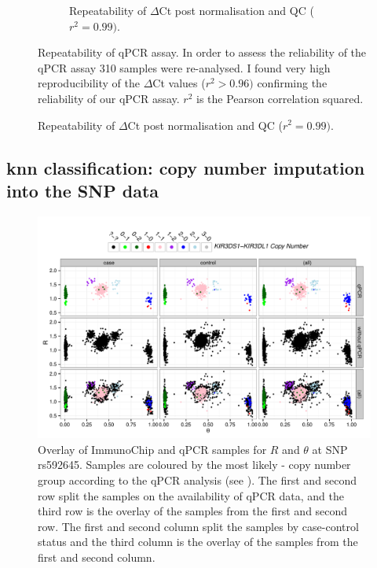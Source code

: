 \begin{figure}[h]
\begin{subfigure}[b]{.4\textwidth}
        \caption{Repeatability of  $\Delta$Ct post normalisation and QC ($r^{2}=0.99)$.}
        \label{}
    \end{subfigure}
    {Repeatability of qPCR assay.}
    {
        In order to assess the reliability of the qPCR assay 310 samples were re-analysed.
        I found very high reproducibility of the $\Delta$Ct values ($r^{2} > 0.96)$ confirming the reliability of our qPCR assay.
        $r^2$ is the Pearson correlation squared.
    }
\end{figure} 




\subsection{\gls{knn} classification: copy number imputation into the SNP data}

\begin{figure}[h!]
  \centering
  \includegraphics[scale=.6]{figures/Figure-2.pdf}
  {Overlay of ImmunoChip and qPCR samples for $R$ and $\theta$ at SNP rs592645.}
  { Samples are coloured by the most likely - copy number
  group according to the qPCR analysis (see ).  The
  first and second row split the samples on the availability of qPCR data, and
  the third row is the overlay of the samples from the first and second row.
  The first and second column split the samples by case-control status and the
  third column is the overlay of the samples from the first and second column.}
\end{figure}

